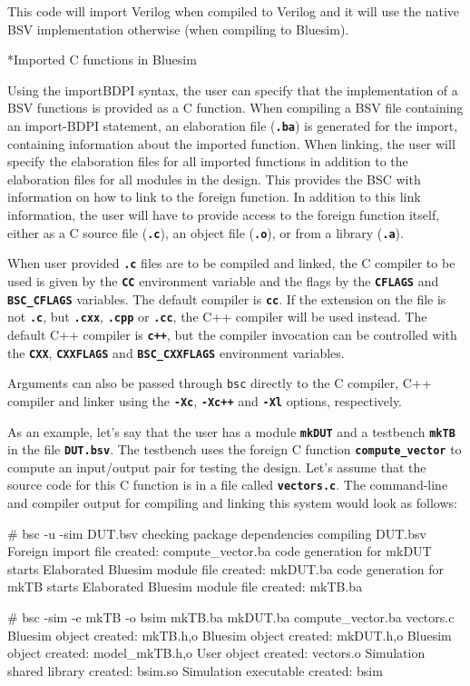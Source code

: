 \documentclass{article}
\makeatletter
\newenvironment{centerboxverbatim}
  {\center
   \boxedverbatim}
  {\endboxedverbatim
  {\endcenter }}
\def\subsubsubsection{\@startsection {subsubsubsection}{4}{\z@}{-3ex plus -1ex minus -.2ex}{1.25ex plus .2ex}{\normalsize\bf}*}
\makeatother
\begin{document}
This code will import Verilog when compiled to Verilog and
it will  use the native BSV implementation otherwise (when compiling
to Bluesim).


\subsubsubsection{Imported C functions in Bluesim}
\label{importC-bluesim}

Using the importBDPI syntax, the user can specify that the
implementation of a BSV functions is provided as a C function.
When compiling a BSV file
containing an import-BDPI statement, an elaboration file ({\bf\tt .ba}) is
generated for the import, containing information about the imported
function.  When linking, the user will specify the elaboration files
for all  imported functions in addition to the
elaboration files for all modules in the design.
This provides the BSC with  information  on
how to  link
to the foreign function.  In addition to this link information, the
user will have to provide access to the foreign function itself,
either as a C source file ({\bf\tt .c}), an object file ({\bf\tt .o}), or from
a library ({\bf\tt .a}).

When user provided {\bf\tt .c} files are to
be compiled and linked, the C compiler to be used is given by the
{\bf\tt CC} environment variable and the flags by the {\bf\tt CFLAGS}
and {\bf\tt BSC\_CFLAGS} variables.
The default compiler is {\bf\tt cc}.  If the extension on
the file is not {\bf\tt .c}, but {\bf\tt .cxx}, {\bf\tt .cpp} or
{\bf\tt .cc}, the C++ compiler will be used instead.
The default C++ compiler is {\bf\tt c++}, but the
compiler invocation can be controlled with the {\bf\tt CXX},
{\bf\tt CXXFLAGS} and {\bf\tt BSC\_CXXFLAGS} environment variables.

Arguments can also be passed through {\tt bsc} directly to the C
compiler, C++ compiler and linker using the {\tt\bf -Xc},
 {\tt\bf -Xc++} and {\tt\bf -Xl} options, respectively.

As an example, let's say that the user has a module {\bf\tt mkDUT}
and a testbench {\bf\tt mkTB} in the file {\bf\tt DUT.bsv}.  The testbench
uses the foreign C function {\bf\tt compute\_vector} to compute an
input/output pair for testing the design.  Let's assume that the
source code for this C function is in a file called {\bf\tt vectors.c}.
The command-line and compiler output for compiling and linking this system
would look as follows:

\begin{centerboxverbatim}
# bsc -u -sim DUT.bsv
checking package dependencies
compiling DUT.bsv
Foreign import file created: compute_vector.ba
code generation for mkDUT starts
Elaborated Bluesim module file created: mkDUT.ba
code generation for mkTB starts
Elaborated Bluesim module file created: mkTB.ba

# bsc -sim -e mkTB -o bsim mkTB.ba mkDUT.ba compute_vector.ba vectors.c
Bluesim object created: mkTB.{h,o}
Bluesim object created: mkDUT.{h,o}
Bluesim object created: model_mkTB.{h,o}
User object created: vectors.o
Simulation shared library created: bsim.so
Simulation executable created: bsim
\end{centerboxverbatim}
\end{document}
